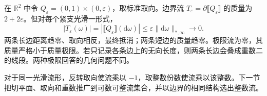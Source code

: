 \begin{example}\label{g3:exm:current-parallel-cancellation}
	在 \(\mathbb R^2\) 中令 \(Q_\varepsilon=(0,1)\times(0,\varepsilon)\)，取标准取向。边界流 \(T_\varepsilon=\partial\lBrack Q_\varepsilon\rBrack\) 的质量为 \(2+2\varepsilon\)。但对每个紧支光滑一形式，
	\[
		|T_\varepsilon(\omega)|
		=|\lBrack Q_\varepsilon\rBrack(\mathrm d\omega)|
		\le\varepsilon\|\mathrm d\omega\|_{*,\infty}\longrightarrow0.
	\]
	两条长边距离趋零、取向相反，最终抵消；两条短边的质量趋零。极限流为零，其质量严格小于质量极限。若只记录各条边上的无向长度，则两条长边会叠成重数二的线段。两种极限回答的几何问题不同。
\end{example}

对于同一光滑流形，反转取向使流乘以 \(-1\)，取整数份数使流乘以该整数。下一节把切平面、取向和重数推广到可数可整流集合，并以边界的相同结构选出整数流。
